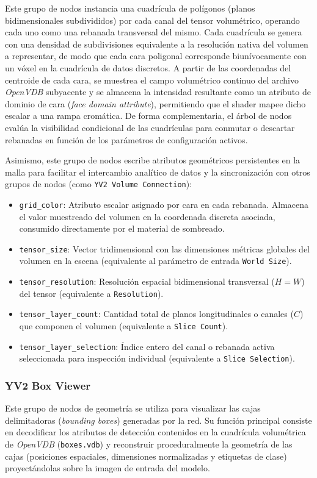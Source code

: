 Este grupo de nodos instancia una cuadrícula de polígonos (planos bidimensionales subdivididos) por cada canal del tensor volumétrico,
operando cada uno como una rebanada transversal del mismo. Cada cuadrícula se genera con una densidad de subdivisiones equivalente a la 
resolución nativa del volumen a representar, de modo que cada cara poligonal corresponde biunívocamente con un vóxel en la cuadrícula de datos discretos.
A partir de las coordenadas del centroide de cada cara, se muestrea el campo volumétrico continuo del archivo \textit{OpenVDB} subyacente y se almacena 
la intensidad resultante como un atributo de dominio de cara (\textit{face domain attribute}), permitiendo que el shader mapee dicho escalar a una rampa 
cromática. De forma complementaria, el árbol de nodos evalúa la visibilidad condicional de las cuadrículas para conmutar o descartar rebanadas en función 
de los parámetros de configuración activos.
\medskip

Asimismo, este grupo de nodos escribe atributos geométricos persistentes en la malla para facilitar el intercambio analítico de datos y la 
sincronización con otros grupos de nodos (como \texttt{YV2 Volume Connection}):

\begin{itemize}
    \item \texttt{grid\_color}: Atributo escalar asignado por cara en cada rebanada. Almacena el valor muestreado del volumen en la 
    coordenada discreta asociada, consumido directamente por el material de sombreado.
    \item \texttt{tensor\_size}: Vector tridimensional con las dimensiones métricas globales del volumen en la escena 
    (equivalente al parámetro de entrada \texttt{World Size}).
    \item \texttt{tensor\_resolution}: Resolución espacial bidimensional transversal ($H = W$) del tensor (equivalente a \texttt{Resolution}).
    \item \texttt{tensor\_layer\_count}: Cantidad total de planos longitudinales o canales ($C$) que componen el volumen (equivalente a \texttt{Slice Count}).
    \item \texttt{tensor\_layer\_selection}: Índice entero del canal o rebanada activa seleccionada para inspección individual (equivalente a \texttt{Slice Selection}).
\end{itemize}

\subsubsection{YV2 Box Viewer}
Este grupo de nodos de geometría se utiliza para visualizar las cajas delimitadoras (\textit{bounding boxes}) generadas por la red. Su función principal 
consiste en decodificar los atributos de detección contenidos en la cuadrícula volumétrica de \textit{OpenVDB} (\texttt{boxes.vdb}) y reconstruir proceduralmente 
la geometría de las cajas (posiciones espaciales, dimensiones normalizadas y etiquetas de clase) proyectándolas sobre la imagen de entrada del modelo.
\medskip

